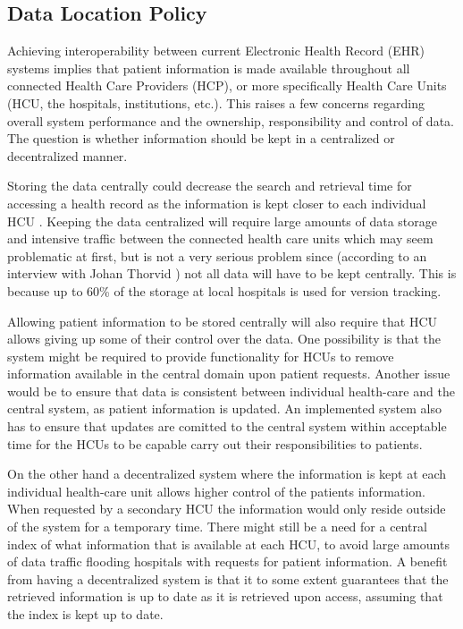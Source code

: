 \documentclass[14pt]{article}
\begin{document}
\subsection{Data Location Policy} %
\label{sec:resultsLocality}

Achieving interoperability between current Electronic Health Record (EHR) systems implies that patient information is made available throughout all connected Health Care Providers (HCP), or more specifically Health Care Units (HCU, the hospitals, institutions, etc.). This raises a few concerns regarding overall system performance and the ownership, responsibility and control of data. The question is whether information should be kept in a centralized or decentralized manner.

Storing the data centrally could decrease the search and retrieval time for accessing a health record as the information is kept closer to each individual \gls{HCU} \cite{Cambio}. Keeping the data centralized will require large amounts of data storage and intensive traffic between the connected health care units which may seem problematic at first, but is not a very serious problem since (according to an interview with Johan Thorvid \cite{Cambio}) not all data will have to be kept centrally. This is because up to 60\% of the storage at local hospitals is used for version tracking.

Allowing patient information to be stored centrally will also require that \gls{HCU} allows giving up some of their control over the data. One possibility is that the system might be required to provide functionality for \glspl{HCU} to remove information available in the central domain upon patient requests. Another issue would be to ensure that data is consistent between individual health-care and the central system, as patient information is updated. An implemented system also has to ensure that updates are comitted to the central system within acceptable time for the \glspl{HCU} to be capable carry out their responsibilities to patients.

On the other hand a decentralized system where the information is kept at each individual health-care unit allows higher control of the patients information. When requested by a secondary \gls{HCU} the information would only reside outside of the system for a temporary time. There might still be a need for a central index of what information that is available at each \gls{HCU}, to avoid large amounts of data traffic flooding hospitals with requests for patient information. A benefit from having a decentralized system is that it to some extent guarantees that the retrieved information is up to date as it is retrieved upon access, assuming that the index is kept up to date.
\end{document}
